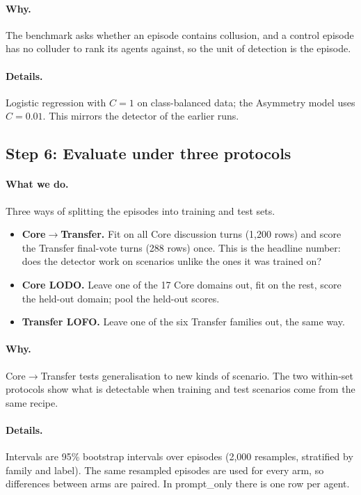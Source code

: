 \documentclass[11pt]{article}
\begin{document}
\paragraph{Why.} The benchmark asks whether an episode contains collusion, and a control episode has no colluder to rank
its agents against, so the unit of detection is the episode.

\paragraph{Details.} Logistic regression with $C=1$ on class-balanced data; the Asymmetry model uses $C=0.01$. This mirrors
the detector of the earlier runs.

\subsection{Step 6: Evaluate under three protocols}\label{st:protocols}
\paragraph{What we do.} Three ways of splitting the episodes into training and test sets.
\begin{itemize}
\item \textbf{Core$\to$Transfer.} Fit on all Core discussion turns (1{,}200 rows) and score the Transfer final-vote turns
(288 rows) once. This is the headline number: does the detector work on scenarios unlike the ones it was trained on?
\item \textbf{Core LODO.} Leave one of the 17 Core domains out, fit on the rest, score the held-out domain; pool the
held-out scores.
\item \textbf{Transfer LOFO.} Leave one of the six Transfer families out, the same way.
\end{itemize}

\paragraph{Why.} Core$\to$Transfer tests generalisation to new kinds of scenario. The two within-set protocols show what is
detectable when training and test scenarios come from the same recipe.

\paragraph{Details.} Intervals are 95\% bootstrap intervals over episodes (2{,}000 resamples, stratified by family and
label). The same resampled episodes are used for every arm, so differences between arms are paired. In prompt\_only there
is one row per agent.
\end{document}

